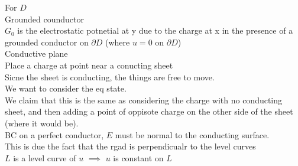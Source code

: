 \documentclass[answers,12pt,addpoints]{exam}
\begin{document}
For $D$ \\
Grounded counductor\\
$G_0$ is the electrostatic potnetial at y due to the charge at x in the presence of a grounded conductor on $\partial D$ (where $u = 0$ on $\partial D$)\\

Conductive plane\\
Place a charge at point near a conucting sheet\\
Sicne the sheet is conducting, the things are free to move.\\
We want to consider the eq state.\\
We claim that this is the same as considering the charge with no conducting sheet, and then adding a point of oppisote charge on the other side of the sheet (where it would be).\\

BC on a perfect conductor, $E$ must be normal to the conducting surface.\\
This is due the fact that the rgad is perpendicualr to the level curves\\
$L$ is a level curve of $u$ $\implies$ $ u $ is constant on $L$\\
\end{document}
